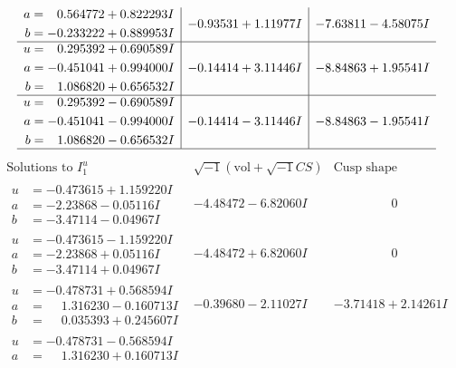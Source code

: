 \documentclass[1p]{elsarticle_modified}
\theoremstyle{definition}
\newcommand{\I}{\sqrt{-1}}
\begin{document}
$$\begin{array}{c|c|c}
\begin{aligned}
a &= \phantom{-}0.564772 + 0.822293 I \\
b &= -0.233222 + 0.889953 I\end{aligned}
 & -0.93531 + 1.11977 I & -7.63811 - 4.58075 I \\ \hline\begin{aligned}
u &= \phantom{-}0.295392 + 0.690589 I \\
a &= -0.451041 + 0.994000 I \\
b &= \phantom{-}1.086820 + 0.656532 I\end{aligned}
 & -0.14414 + 3.11446 I & -8.84863 + 1.95541 I \\ \hline\begin{aligned}
u &= \phantom{-}0.295392 - 0.690589 I \\
a &= -0.451041 - 0.994000 I \\
b &= \phantom{-}1.086820 - 0.656532 I\end{aligned}
 & -0.14414 - 3.11446 I & -8.84863 - 1.95541 I\\
 \hline 
 \end{array}$$\newpage$$\begin{array}{c|c|c}  
\text{Solutions to }I^u_{1}& \I (\text{vol} + \sqrt{-1}CS) & \text{Cusp shape}\\
 \hline 
\begin{aligned}
u &= -0.473615 + 1.159220 I \\
a &= -2.23868 - 0.05116 I \\
b &= -3.47114 - 0.04967 I\end{aligned}
 & -4.48472 - 6.82060 I & \phantom{-0.000000 } 0 \\ \hline\begin{aligned}
u &= -0.473615 - 1.159220 I \\
a &= -2.23868 + 0.05116 I \\
b &= -3.47114 + 0.04967 I\end{aligned}
 & -4.48472 + 6.82060 I & \phantom{-0.000000 } 0 \\ \hline\begin{aligned}
u &= -0.478731 + 0.568594 I \\
a &= \phantom{-}1.316230 - 0.160713 I \\
b &= \phantom{-}0.035393 + 0.245607 I\end{aligned}
 & -0.39680 - 2.11027 I & -3.71418 + 2.14261 I \\ \hline\begin{aligned}
u &= -0.478731 - 0.568594 I \\
a &= \phantom{-}1.316230 + 0.160713 I \\

\end{aligned}
\end{array}$$
\end{document}
